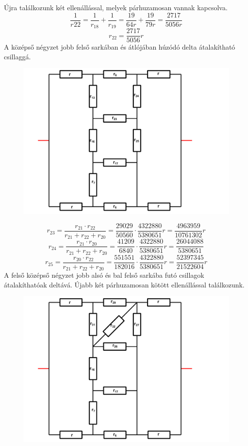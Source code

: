 \documentclass[11pt,a4paper,openany,leqno]{article}
\begin{document}
Újra találkozunk két ellenállással, melyek párhuzamosan vannak kapcsolva.\\
$$ \frac{1}{r_{}22} = \frac{1}{r_{18}} + \frac{1}{r_{19}} =\frac{19}{64r} + \frac{19}{79r} = \frac{2717}{5056r} $$
$$ r_{22} = \frac{2717}{5056}r $$
\newpage
A középső  négyzet jobb felső sarkában és átlójában húzódó delta átalakítható csillaggá.\\

\begin{figure}[h!]
\centering
  \includegraphics[width=150mm,scale=0.5]{grid_3_9.pdf}
  \caption{}
  \label{}
\end{figure}


$$ r_{23} = \frac{r_{21} \cdot r_{22}}{r_{21} + r_{22} + r_{20}} = \frac{29029}{50560} \cdot \frac{4322880}{5380651}r = \frac{4963959}{10761302}r $$
$$ r_{24} = \frac{r_{21} \cdot r_{20}}{r_{21} + r_{22} + r_{20}} = \frac{41209}{6840} \cdot \frac{4322880}{5380651}r = \frac{26044088}{5380651}$$
$$ r_{25} = \frac{r_{20} \cdot r_{22}}{r_{21} + r_{22} + r_{20}} = \frac{551551}{182016} \cdot \frac{4322880}{5380651}r = \frac{52397345}{21522604}r $$
\newpage
A felső középső négyzet jobb alsó és bal felső sarkába futó csillagok átalakíthatóak deltává. Újabb két párhuzamosan kötött ellenállással találkozunk.\\

\begin{figure}[h!]
\centering
  \includegraphics[width=150mm,scale=0.5]{grid_3_10.pdf}
  \caption{}
  \label{}
\end{figure}
\end{document}
